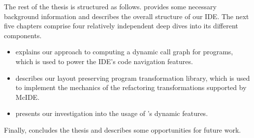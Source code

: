 The rest of the thesis is structured as follows.
 provides some necessary background
information and describes the overall structure of our IDE. The next five
chapters comprise four relatively independent deep dives into its different
components.

\begin{itemize}

\item {} explains our approach to
computing a dynamic call graph for \matlab programs, which is used to power the
IDE's code navigation features.

\item {} describes our layout
preserving program transformation library, which is used to implement the
mechanics of the refactoring transformations supported by McIDE.

\item {} presents our investigation into the
usage of \matlab's dynamic features.

\end{itemize}

Finally,  concludes the thesis and describes some
opportunities for future work.
